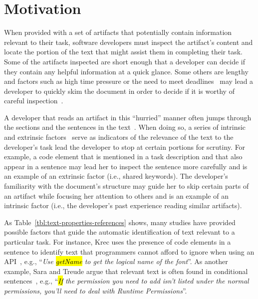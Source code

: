 \section{Motivation}
\label{cp5:motivation}


When provided with a set of artifacts that potentially contain information relevant to their task,
software developers must inspect the artifact's content and locate the portion of the text that might assist them in completing their task. 
Some of the artifacts inspected are short enough that a developer can decide if they contain any helpful information at a quick glance.
Some others are lengthy~\cite{Rastkar2013t} and factors such as high time pressure or the need to meet deadlines~\cite{meyer2019}
may lead a developer to quickly skim the document
in order to decide if it is worthy of careful inspection~\cite{Starke2009}.



A developer that 
reads an artifact in this ``hurried'' manner
often jumps through the sections and the sentences in the text~\cite{Brandt2009a, Starke2009}.
When doing so, a series of intrinsic and extrinsic factors~\cite{Freund2015} 
serve as indicators of the relevance of the text to the developer's task
lead the developer to stop at certain portions for scrutiny.
For example, a code element that is mentioned in a task description 
and that also appear in a sentence may lead 
her to inspect the sentence more carefully and is an example of an extrinsic factor (i.e., shared keywords).
The developer's familiarity with the document's structure
may guide her to skip certain parts of an artifact while focusing her attention to others and is 
an example of an intrinsic factor (i.e., the developer's past experience reading similar artifacts).





As Table~\ref{tbl:text-properties-references} shows, many studies have 
provided possible factors that guide the automatic identification of text relevant to a particular task.
For instance, Krec uses the presence of code elements in a sentence to identify 
text that programmers cannot afford to ignore when using an API~\cite{Robillard2015}, 
e.g., ``\textit{Use \hl{getName} to get the logical name of the font}''.
As another example, Sara and Treude argue that relevant text is often found in conditional sentences~\cite{nadi2020}, 
e.g., ``\textit{\hl{If} the permission you need to add isn't listed under the normal permissions, you'll need to deal with Runtime Permissions}''.


